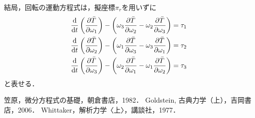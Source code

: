 \documentclass[a4j,10pt]{jsarticle}
\newcommand{\bbn}[2]{\frac{{\rm {\rm d}} #1}{{\rm {\rm d}} #2}}
\newcommand{\henbbn}[2]{\frac{\partial #1}{\partial #2}}
\begin{document}
結局，回転の運動方程式は，擬座標$\pi_r$を用いずに
\begin{subequations}
    \begin{align}
        \bbn{}{t}\left(\henbbn{\bar{T}}{\omega_1}\right) - \left(\omega_3\henbbn{\bar{T}}{\omega_2}- \omega_2\henbbn{\bar{T}}{\omega_3}\right) = \tau_1\\
        \bbn{}{t}\left(\henbbn{\bar{T}}{\omega_2}\right) - \left(\omega_1\henbbn{\bar{T}}{\omega_3}- \omega_3\henbbn{\bar{T}}{\omega_1}\right) = \tau_2\\
        \bbn{}{t}\left(\henbbn{\bar{T}}{\omega_3}\right) - \left(\omega_2\henbbn{\bar{T}}{\omega_1}- \omega_1\henbbn{\bar{T}}{\omega_2}\right) = \tau_3
    \end{align}
\end{subequations}
と表せる．

\begin{thebibliography}{9}
     笠原，微分方程式の基礎，朝倉書店，1982．
     Goldstein, 古典力学（上），吉岡書店，2006．
     Whittaker，解析力学〈上〉，講談社，1977．
\end{thebibliography}
\end{document}

